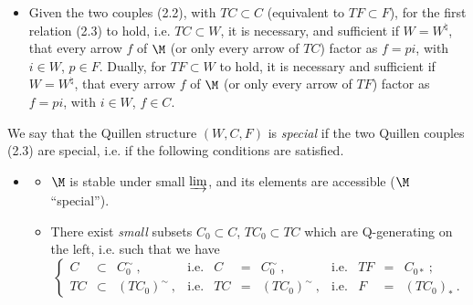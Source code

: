 

\begin{itemize}[leftmargin=4em]
\item[(2.5)] Given the two couples (2.2), with $TC \subset C$ (equivalent to $TF \subset F$), for the first relation (2.3) to hold, i.e. $TC \subset W$, it is necessary, and sufficient if $W = W^{\natural}$, that every arrow $f$ of $\M$ (or only every arrow of $TC$) factor as $f = pi$, with $i \in W$, $p \in F$. Dually, for $TF \subset W$ to hold, it is necessary and sufficient if $W = W^{\natural}$, that every arrow $f$ of $\M$ (or only every arrow of $TF$) factor as $f = pi$, with $i \in W$, $f \in C$. %
\end{itemize}

We say that the Quillen structure $(W,C,F)$ is \textit{special} if the two Quillen couples (2.3) are special, i.e. if the following conditions are satisfied.

\begin{itemize}[leftmargin=4em]
\item[(2.6)]
\begin{itemize}
\item[a)] $\M$ is stable under small $\varinjlim$, and its elements are accessible ($\M$ ``special'').
\item[b)] There exist \textit{small} subsets $C_0 \subset C$, $TC_0 \subset TC$ which are Q-generating on the left, i.e. such that we have
\[
\left\{
\begin{array}{rclcrclcrcl}
C & \subset & C_0^{\sim}\ , & \text{i.e.} & C & = & C_0^{\sim}\ , & \text{i.e.} & TF & = & C_{0*}\ ;\\
TC & \subset & (TC_0)^{\sim}\ , & \text{i.e.} & TC & = & (TC_0)^{\sim}\ , & \text{i.e.} & F & = & (TC_0)_*\ .
\end{array}\right. %
\]
\end{itemize}
\end{itemize}

